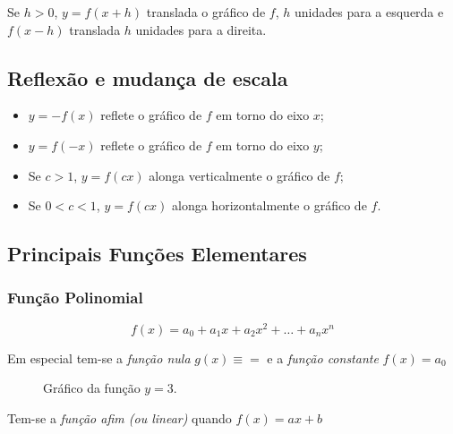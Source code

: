 \documentclass[oneside,a4paper,12pt]{article}
\begin{document}
Se $h>0$, $y = f(x+h)$ translada o gráfico de $f$, $h$ unidades para a esquerda e $f(x-h)$ translada $h$ unidades para a direita.

\subsection{Reflexão e mudança de escala}

\begin{itemize}
	\item $y = -f(x)$ reflete o gráfico de $f$ em torno do eixo $x$;
	\item $y = f(-x)$ reflete o gráfico de $f$ em torno do eixo $y$;
	\item Se $c>1$, $y = f(cx)$ alonga verticalmente o gráfico de $f$;
	\item Se $0<c<1$, $y=f(cx)$ alonga horizontalmente o gráfico de $f$.
\end{itemize}

\subsection{Principais Funções Elementares}

\subsubsection{Função Polinomial}

$$f(x) = a_0+a_1x+a_2x^2+\dots+a_nx^n$$

Em especial tem-se a {\it função nula} $g(x) \equiv =$ e a {\it função constante} $f(x) = a_0$

\begin{figure}[h]
	\centering
	\caption{Gráfico da função $y = 3$.}
\end{figure}

Tem-se a {\it função afim (ou linear)} quando $f(x) = ax+b$
\end{document}
